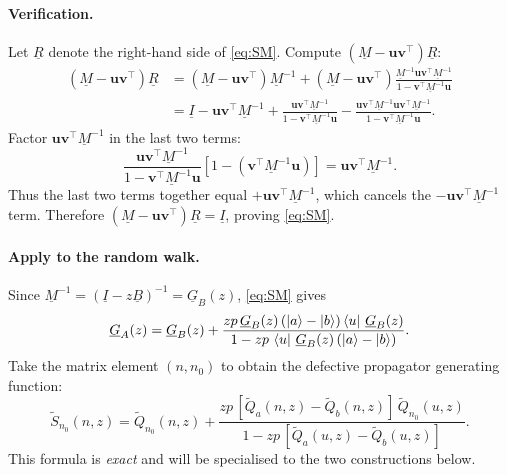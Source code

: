 \documentclass[11pt]{article}
\begin{document}
\paragraph{Verification.}
Let $\underline{R}$ denote the right-hand side of \eqref{eq:SM}.
Compute $(\underline{M}-\bm{u}\bm{v}^\top)\underline{R}$:
\begin{align*}
(\underline{M}-\bm{u}\bm{v}^\top)\underline{R}
&=(\underline{M}-\bm{u}\bm{v}^\top)\underline{M}^{-1}
+(\underline{M}-\bm{u}\bm{v}^\top)\frac{\underline{M}^{-1}\bm{u}\bm{v}^\top \underline{M}^{-1}}{1-\bm{v}^\top \underline{M}^{-1}\bm{u}}\\
&=\underline{I}-\bm{u}\bm{v}^\top \underline{M}^{-1}
+\frac{\bm{u}\bm{v}^\top \underline{M}^{-1}}{1-\bm{v}^\top \underline{M}^{-1}\bm{u}}
-\frac{\bm{u}\bm{v}^\top \underline{M}^{-1}\bm{u}\bm{v}^\top \underline{M}^{-1}}{1-\bm{v}^\top \underline{M}^{-1}\bm{u}}.
\end{align*}
Factor $\bm{u}\bm{v}^\top \underline{M}^{-1}$ in the last two terms:
\[
\frac{\bm{u}\bm{v}^\top \underline{M}^{-1}}{1-\bm{v}^\top \underline{M}^{-1}\bm{u}}
\left[1-(\bm{v}^\top \underline{M}^{-1}\bm{u})\right]
=
\bm{u}\bm{v}^\top \underline{M}^{-1}.
\]
Thus the last two terms together equal $+\bm{u}\bm{v}^\top \underline{M}^{-1}$, which cancels the $-\bm{u}\bm{v}^\top \underline{M}^{-1}$ term.
Therefore $(\underline{M}-\bm{u}\bm{v}^\top)\underline{R}=\underline{I}$, proving \eqref{eq:SM}.

\paragraph{Apply to the random walk.}
Since $\underline{M}^{-1}=(\underline{I}-z\underline{B})^{-1}=\underline{G}_B(z)$, \eqref{eq:SM} gives
\begin{equation}
\underline{G}_A(z)
=
\underline{G}_B(z)
+
\frac{z p\,\underline{G}_B(z)\,(\ket a-\ket b)\bra u\,\underline{G}_B(z)}
{1-z p\,\bra u\,\underline{G}_B(z)\,(\ket a-\ket b)}.
\label{eq:GA_update}
\end{equation}
Take the matrix element $(n,n_0)$ to obtain the defective propagator generating function:
\begin{equation}
\boxed{
\tilde S_{n_0}(n,z)
=
\tilde Q_{n_0}(n,z)
+
\frac{z p\,[\tilde Q_a(n,z)-\tilde Q_b(n,z)]\,\tilde Q_{n_0}(u,z)}
{1-z p\,[\tilde Q_a(u,z)-\tilde Q_b(u,z)]}.
}
\label{eq:S_general_ab}
\end{equation}
This formula is \emph{exact} and will be specialised to the two constructions below.
\end{document}
